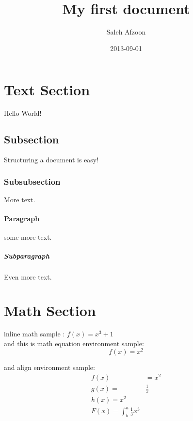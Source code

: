 \documentclass{article}
\title{My first document}
\date{2013-09-01}
\author{Saleh Afzoon}
\begin{document}
\maketitle
\newpage
  


\section{Text Section}
Hello World!

\subsection{Subsection}
Structuring a document is easy!

\subsubsection{Subsubsection}
More text.

\paragraph{Paragraph}
some more text.

\subparagraph{Subparagraph}
Even more text.

\section{Math Section}
inline math sample : $ f(x) = x^3 +1 $ \\

and this is math equation environment sample:
\begin{equation*}
	f(x) = x^2
\end{equation*}

and align environment sample:
\begin{align*}
  f(x) &= x^2\\
  g(x) =& \frac{1}{x}\\
  h(x) = x^2\\
  F(x) = \int^a_b \frac{1}{3}x^3 &
\end{align*}
\end{document}
